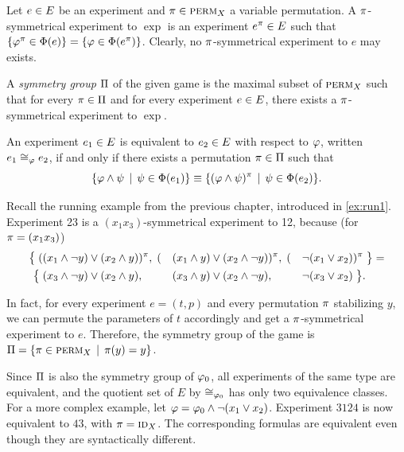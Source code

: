 \begin{definition} \label{def:expeq}
Let $e\in E$ be an experiment and $\pi\in\textsc{perm}_X$ a variable permutation.
A $\pi$-symmetrical experiment to $\exp$ is an experiment
  $e^\pi\in E$
  such that
  $\{\varphi^\pi \in\Phi(e)\} = \{\varphi\in\Phi(e^\pi)\}$.
Clearly, no $\pi$-symmetrical experiment to $e$ may exists.

A \emph{symmetry group} $\Pi$ of the given game is
  the maximal subset of $\textsc{perm}_X$ such that for
  every $\pi\in\Pi$ and for every experiment $e\in E$,
  there exists a $\pi$-symmetrical experiment to $\exp$.

An experiment $e_1\in E$ is equivalent to $e_2\in E$ with respect to $\varphi$,
  written $e_1\cong_{\varphi}e_2$,
  if and only if there exists a permutation $\pi\in\Pi$ such that
 \[ \{ \varphi\wedge\psi \:\:|\:\: \psi\in\Phi(e_1) \} \equiv
   \{ (\varphi\wedge\psi)^\pi \:\:|\:\: \psi\in\Phi(e_2) \}. \]
\end{definition}

\begin{example}
Recall the running example from the previous chapter, introduced in \autoref{ex:run1}.
Experiment 23 is a $(x_1x_3)$-symmetrical experiment to 12, because (for $\pi = (x_1x_3)$)
\begin{alignat*}{5}
\big\{ \;(&(x_1 \wedge \neg y) \vee (x_2\wedge y))^\pi,\;
   (&&(x_1 \wedge y) \vee (x_2\wedge\neg y))^\pi,\;
   (&&\neg (x_1  \vee x_2))^\pi \;\big\} = \\
\big\{ \;&(x_3 \wedge \neg y) \vee (x_2\wedge y),
   &&(x_3 \wedge y) \vee (x_2\wedge\neg y),
   &&\neg (x_3 \vee x_2)\; \big\}.
\end{alignat*}

In fact, for every experiment $e = (t, p)$ and every permutation $\pi$ stabilizing $y$,
  we can permute the parameters of $t$ accordingly and get a $\pi$-symmetrical experiment to $e$.
Therefore, the symmetry group of the game is $\Pi = \{\pi\in\textsc{perm}_X \:\:|\:\: \pi(y) = y\}$.

Since $\Pi$ is also the symmetry group of $\varphi_0$,
  all experiments of the same type are equivalent,
  and the quotient set of $E$ by $\cong_{\varphi_0}$
  has only two equivalence classes.
For a more complex example, let $\varphi = \varphi_0\wedge\neg(x_1\vee x_2)$.
Experiment $3124$ is now equivalent to $43$, with $\pi = \textsc{id}_X$.
The corresponding formulas are equivalent even though they
  are syntactically different.
\end{example}

